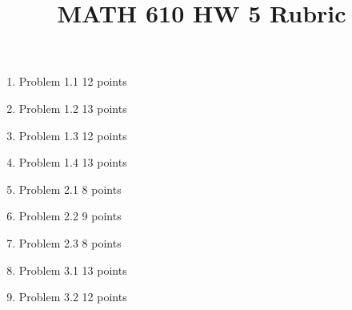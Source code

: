 \documentclass{article}
\title{MATH 610 HW 5 Rubric}
\author{}
\date{}
\begin{document}
\maketitle

\begin{enumerate}
	\item Problem 1.1 12 points
	\item Problem 1.2 13 points
	\item Problem 1.3 12 points
	\item Problem 1.4 13 points
	\item Problem 2.1 8 points
	\item Problem 2.2 9 points
	\item Problem 2.3 8 points
	\item Problem 3.1 13 points
	\item Problem 3.2 12 points
\end{enumerate}
\end{document}
